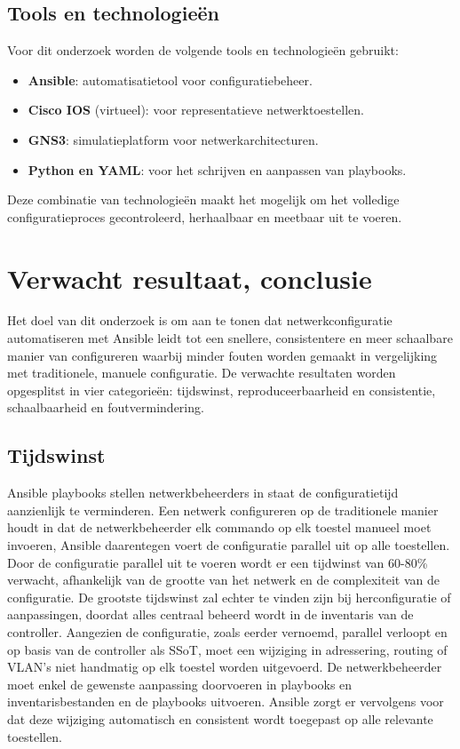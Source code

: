 \subsection{Tools en technologieën}
Voor dit onderzoek worden de volgende tools en technologieën gebruikt:
\begin{itemize}
  \item \textbf{Ansible}: automatisatietool voor configuratiebeheer.
  \item \textbf{Cisco IOS} (virtueel): voor representatieve netwerktoestellen.
  \item \textbf{GNS3}: simulatieplatform voor netwerkarchitecturen.
  \item \textbf{Python en YAML}: voor het schrijven en aanpassen van playbooks.
\end{itemize}
Deze combinatie van technologieën maakt het mogelijk om het volledige configuratieproces gecontroleerd, herhaalbaar en meetbaar uit te voeren.


\section{Verwacht resultaat, conclusie}%
\label{sec:verwachte_resultaten}

Het doel van dit onderzoek is om aan te tonen dat netwerkconfiguratie automatiseren met Ansible leidt tot een snellere, consistentere en meer schaalbare manier van configureren waarbij minder fouten worden gemaakt in vergelijking met traditionele, manuele configuratie.
De verwachte resultaten worden opgesplitst in vier categorieën: tijdswinst, reproduceerbaarheid en consistentie, schaalbaarheid en foutvermindering.

\subsection{Tijdswinst}

Ansible playbooks stellen netwerkbeheerders in staat de configuratietijd aanzienlijk te verminderen.
Een netwerk configureren op de traditionele manier houdt in dat de netwerkbeheerder elk commando op elk toestel manueel moet invoeren, Ansible daarentegen voert de configuratie parallel uit op alle toestellen.
Door de configuratie parallel uit te voeren wordt er een tijdwinst van 60-80\% verwacht, afhankelijk van de grootte van het netwerk en de complexiteit van de configuratie.
De grootste tijdswinst zal echter te vinden zijn bij herconfiguratie of aanpassingen, doordat alles centraal beheerd wordt in de inventaris van de controller. 
Aangezien de configuratie, zoals eerder vernoemd, parallel verloopt en op basis van de controller als SSoT, moet een wijziging in adressering, routing of VLAN's niet handmatig op elk toestel worden uitgevoerd.
De netwerkbeheerder moet enkel de gewenste aanpassing doorvoeren in playbooks en inventarisbestanden en de playbooks uitvoeren.
Ansible zorgt er vervolgens voor dat deze wijziging automatisch en consistent wordt toegepast op alle relevante toestellen.

